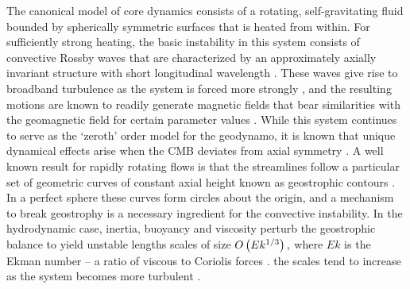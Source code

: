 
The canonical model of core dynamics consists of a rotating, self-gravitating fluid bounded by spherically symmetric surfaces that is heated from within. 
For sufficiently strong heating, the basic instability in this system consists of convective Rossby waves that are characterized by an approximately axially invariant structure with short longitudinal wavelength \citep{pR68,fB70}. 
These waves give rise to broadband turbulence as the system is forced more strongly \citep[e.g.][]{tG16,jN24}, and the resulting motions are known to readily generate magnetic fields that bear similarities with the geomagnetic field for certain parameter values \citep{nS17,cF23,juA23,nG22,nG24,yL25}. While this system continues to serve as the `zeroth' order model for the geodynamo, it is known that unique dynamical effects arise when the CMB deviates from axial symmetry \citep{dJ20,rM25}. %
A well known result for rapidly rotating flows is that the streamlines follow a particular set of geometric curves of constant axial height known as geostrophic contours \citep{hG68}. 
In a perfect sphere these curves form circles about the origin, and a mechanism to break geostrophy is a necessary ingredient for the convective instability. 
In the hydrodynamic case,  inertia, buoyancy and viscosity perturb the geostrophic balance to yield unstable lengths scales of size $O\left ( Ek^{1/3}\right ),$ where $Ek$ is the Ekman number -- a ratio of viscous to Coriolis forces \citep{sC61}. 
the scales tend to increase as the system becomes more turbulent \citep{tG16, cG19, tO23, jN24, cG25}. 

